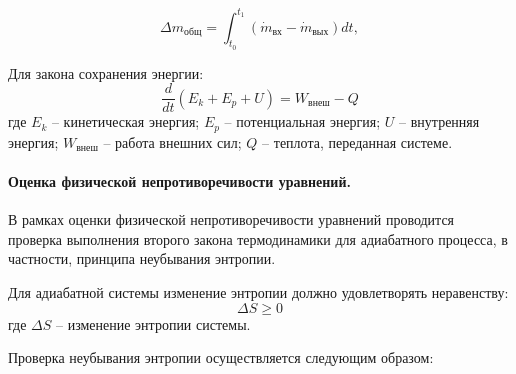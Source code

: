 \begin{equation}
    \Delta m_\text{общ} = \int_{t_0}^{t_1} (\dot{m}_\text{вх} - \dot{m}_\text{вых}) dt,
\end{equation}

Для закона сохранения энергии:
\begin{equation}
    \frac{d}{dt}(E_k + E_p + U) = W_{\text{внеш}} - Q
\end{equation}
где $E_k$ -- кинетическая энергия;
$E_p$ -- потенциальная энергия;
$U$ -- внутренняя энергия;
$W_{\text{внеш}}$ -- работа внешних сил;
$Q$ -- теплота, переданная системе.

\paragraph{Оценка физической непротиворечивости уравнений.}

В рамках оценки физической непротиворечивости уравнений проводится проверка
выполнения второго закона термодинамики для адиабатного процесса, в частности, принципа неубывания энтропии.

Для адиабатной системы изменение энтропии должно удовлетворять неравенству:
\begin{equation}
    \Delta S \geq 0
\end{equation}
где $\Delta S$ -- изменение энтропии системы.

Проверка неубывания энтропии осуществляется следующим образом:


